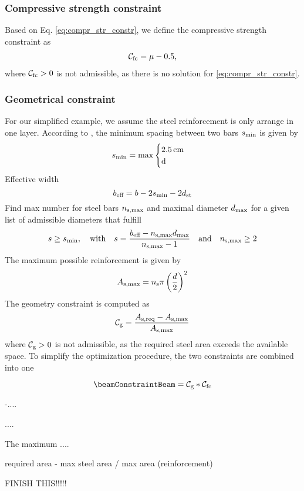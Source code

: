 \subsubsection{Compressive strength constraint}
Based on Eq. \ref{eq:compr_str_constr}, we define the compressive strength constraint as
\begin{align}
	\mathcal{C}_{\text{fc}} = \mu - 0.5, 
\end{align}
where $\mathcal{C}_{\text{fc}} > 0$ is not admissible, as there is no solution for \ref{eq:compr_str_constr}.
\subsubsection{Geometrical constraint}
For our simplified example, we assume the steel reinforcement is only arrange in one layer.
According to \citeauthor{DIN1992-1-1}, the minimum spacing between two bars $s_{\text{min}}$ is given by
\begin{equation}
	\beamMinSpacing = \max
	\begin{cases}
		\inputconcretecover \,\text{\inputconcretecoverunit}\\
		$\beamSteelDiameter$
	\end{cases}       
\end{equation}
Effective width
\begin{equation}
	b_{\text{eff}} = b - 2 s_{\text{min}} - 2 d_{\text{st}}
\end{equation}
Find max number for steel bars $n_{\text{s,max}}$ and maximal diameter $d_{\text{max}}$ for a given list of admissible diameters that fulfill
\begin{equation}
	s \ge s_{\text{min}},\quad\text{with}\quad s = \frac{b_{\text{eff}} - n_{\text{s,max}} d_{\text{max}}}{n_{\text{s,max}} - 1} \quad\text{and}\quad n_{\text{s,max}} \ge 2
\end{equation}
The maximum possible reinforcement is given by
\begin{equation}
	A_{\text{s,max}} = n_{\text{s}} \pi \left( \frac{d}{2}\right)^{2}
\end{equation}
The geometry constraint is computed as
\begin{equation}
	\mathcal{C}_{\text{g}} = \frac{A_{\text{s,req}} - A_{\text{s,max}}}{A_{\text{s,max}}}
\end{equation}
where $\mathcal{C}_{\text{g}} > 0$ is not admissible, as the required steel area exceeds the available space.
To simplify the optimization procedure, the two constraints are combined into one

\begin{equation}
	\beamConstraintBeam = \beamConstraintGeometry * \beamConstraintFc
\end{equation}




-....%


....

The maximum ....


required area  - max steel area / max area (reinforcement)


FINISH THIS!!!!!



